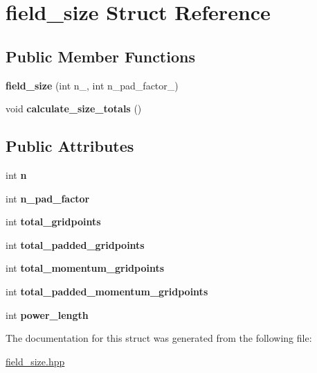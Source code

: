\hypertarget{structfield__size}{
\section{field\_\-size Struct Reference}
\label{structfield__size}
}
\subsection*{Public Member Functions}
\begin{DoxyCompactItemize}
\item 
\hypertarget{structfield__size_a254e4e6981aa1ffe35ea5c1483746bfb}{
{\bfseries field\_\-size} (int n\_, int n\_\-pad\_\-factor\_)}
\label{structfield__size_a254e4e6981aa1ffe35ea5c1483746bfb}

\item 
\hypertarget{structfield__size_a6a36046bb0b1af8832c01f08a6e027d4}{
void {\bfseries calculate\_\-size\_\-totals} ()}
\label{structfield__size_a6a36046bb0b1af8832c01f08a6e027d4}

\end{DoxyCompactItemize}
\subsection*{Public Attributes}
\begin{DoxyCompactItemize}
\item 
\hypertarget{structfield__size_a1ce564998368ac36020f6f995c13a5d3}{
int {\bfseries n}}
\label{structfield__size_a1ce564998368ac36020f6f995c13a5d3}

\item 
\hypertarget{structfield__size_a0b3f5b29f65549faa2517c1bc964decb}{
int {\bfseries n\_\-pad\_\-factor}}
\label{structfield__size_a0b3f5b29f65549faa2517c1bc964decb}

\item 
\hypertarget{structfield__size_ae4d4e8fc4d86b3e2f627c4429d661199}{
int {\bfseries total\_\-gridpoints}}
\label{structfield__size_ae4d4e8fc4d86b3e2f627c4429d661199}

\item 
\hypertarget{structfield__size_a092ff1172bfd7cfa999fa468308793f0}{
int {\bfseries total\_\-padded\_\-gridpoints}}
\label{structfield__size_a092ff1172bfd7cfa999fa468308793f0}

\item 
\hypertarget{structfield__size_a65f0c4c1268e8329ece29add7b4f5839}{
int {\bfseries total\_\-momentum\_\-gridpoints}}
\label{structfield__size_a65f0c4c1268e8329ece29add7b4f5839}

\item 
\hypertarget{structfield__size_ad8a51d55670b939f7f62870ce6fa0876}{
int {\bfseries total\_\-padded\_\-momentum\_\-gridpoints}}
\label{structfield__size_ad8a51d55670b939f7f62870ce6fa0876}

\item 
\hypertarget{structfield__size_a816daef8429bcca5f5a88f68e93be903}{
int {\bfseries power\_\-length}}
\label{structfield__size_a816daef8429bcca5f5a88f68e93be903}

\end{DoxyCompactItemize}


The documentation for this struct was generated from the following file:\begin{DoxyCompactItemize}
\item 
\hyperlink{field__size_8hpp}{field\_\-size.hpp}\end{DoxyCompactItemize}
